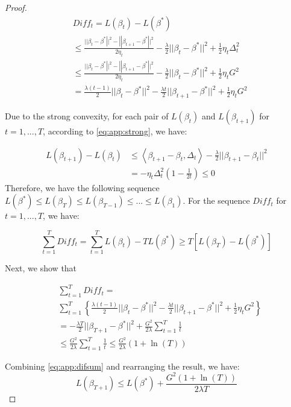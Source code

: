 \begin{proof}
	\begin{equation}\label{eq:app:it_diff}
	\begin{aligned}
	&{Diff}_t = L(\beta_t)-L(\beta^*)\\
	 &\leq \frac{{||{\beta _t} - {\beta ^*}|{|^2} - ||{\beta _{t + 1}} - {\beta ^*}|{|^2}}}{{2{\eta _t}}} - \frac{\lambda }{2}||{\beta _t} - {\beta ^*}|{|^2} + \frac{1}{2}{\eta _t}\Delta _t^2 \\
	&\leq \frac{{||{\beta _t} - {\beta ^*}|{|^2} - ||{\beta _{t + 1}} - {\beta ^*}|{|^2}}}{{2{\eta _t}}} - \frac{\lambda }{2}||{\beta _t} - {\beta ^*}|{|^2} + \frac{1}{2}{\eta _t} G^2\\
	&=\frac{\lambda (t-1)}{2}{||{\beta _t} - {\beta ^*}||^2}- \frac{\lambda t}{2}{||{\beta _{t+1}} - {\beta ^*}||^2}+\frac{1}{2}{\eta _t} G^2
	\end{aligned}
	\end{equation}
	
	Due to the strong convexity, for each pair of $L(\beta_t)$ and $L(\beta_{t+1})$ for $t=1,...,T$, according to \eqref{eq:app:strong}, we have:
	
	\begin{equation}
	\begin{aligned}
	L({\beta _{t + 1}}) - L({\beta _t}) &\le \left\langle {{\beta _{t + 1}} - {\beta _t},{\Delta _t}} \right\rangle  - \frac{\lambda }{2}||{\beta _{t + 1}} - \beta_t |{|^2} \\
	&=  - \eta_t\Delta _t^2 (1-\frac{1}{2t}) \leq 0
	\end{aligned}
	\end{equation}
	Therefore, we have the following sequence $L(\beta^*) \leq L(\beta_T) \leq L(\beta_{T-1}) \leq...\leq L(\beta_1)$. 
	For the sequence $Diff_t$ for $t=1,...,T$, we have:
	
	\begin{equation} \label{eq:app:difsum}
	\sum_{t=1}^{T} Diff_t =  \sum_{t=1}^{T}L(\beta_t)-TL(\beta^*) \geq T\left[L(\beta_T)-L(\beta^*)\right]
	\end{equation}
	
	Next, we show that 
	
	\begin{equation}
	\begin{aligned}
	&\sum_{t=1}^{T} Diff_t =\\
	&\sum_{t=1}^{T}\left\{\frac{\lambda (t-1)}{2}{||{\beta _t} - {\beta ^*}||^2}- \frac{\lambda t}{2}{||{\beta _{t+1}} - {\beta ^*}||^2}+\frac{1}{2}{\eta _t} G^2\right\} \\
	&=-\frac{\lambda T}{2}{||{\beta _{T+1}-\beta^*}||^2} + \frac{G^2}{2 \lambda}\sum_{t=1}^{T} \frac{1}{t}\\
	&\leq \frac{G^2}{2 \lambda}\sum_{t=1}^{T} \frac{1}{t} \leq \frac{G^2}{2 \lambda}(1+\ln(T))
	\end{aligned}
	\end{equation}
	
	Combining \eqref{eq:app:difsum} and rearranging the result, we have:
	\begin{equation*}
	L(\beta_{T+1}) \leq L(\beta^*)+\frac{G^2(1+\ln (T))}{2\lambda T}
	\end{equation*}
\end{proof}